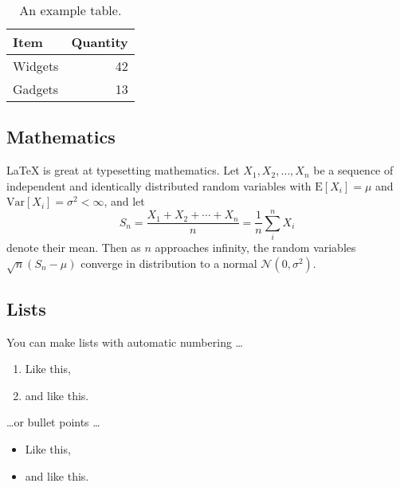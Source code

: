 \documentclass[
fontsize=11pt,paper=a4,
bibliography=totoc, listof=totoc,
headsepline,footsepline,
footinclude=false,BCOR=12mm,DIV=13]{scrbook}
\begin{document}
\begin{table}
\centering
\begin{tabular}{l|r}
Item & Quantity \\\hline
Widgets & 42 \\
Gadgets & 13
\end{tabular}
\caption{\label{tab:widgets}An example table.}
\end{table}

\subsection{Mathematics}

\LaTeX{} is great at typesetting mathematics. Let $X_1, X_2, \ldots, X_n$ be a sequence of independent and identically distributed random variables with $\text{E}[X_i] = \mu$ and $\text{Var}[X_i] = \sigma^2 < \infty$, and let
$$S_n = \frac{X_1 + X_2 + \cdots + X_n}{n}
      = \frac{1}{n}\sum_{i}^{n} X_i$$
denote their mean. Then as $n$ approaches infinity, the random variables $\sqrt{n}(S_n - \mu)$ converge in distribution to a normal $\mathcal{N}(0, \sigma^2)$.

\subsection{Lists}

You can make lists with automatic numbering \dots

\begin{enumerate}
\item Like this,
\item and like this.
\end{enumerate}
\dots or bullet points \dots
\begin{itemize}
\item Like this,
\item and like this.
\end{itemize}
\end{document}

